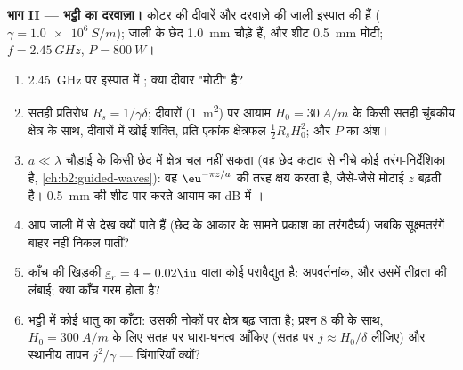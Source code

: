 \begin{problem}
\medskip
\noindent\textbf{भाग II --- भट्ठी का दरवाज़ा।}
कोटर की दीवारें और दरवाज़े की जाली इस्पात की हैं ($\gamma = \qty{1.0e6}{S/m}$);
जाली के छेद \qty{1.0}{mm} चौड़े हैं, और शीट \qty{0.5}{mm} मोटी;
$f = \qty{2.45}{GHz}$, $P = \qty{800}{W}$।
\begin{enumerate}[resume]
  \item \qty{2.45}{GHz} पर इस्पात में ; क्या दीवार "मोटी" है?
  \item सतही प्रतिरोध $R_s = 1/\gamma\delta$; दीवारों (\qty{1}{m^2}) पर आयाम
        $H_0 = \qty{30}{A/m}$ के किसी सतही चुंबकीय क्षेत्र के साथ,
        दीवारों में खोई शक्ति, प्रति एकांक क्षेत्रफल $\tfrac12R_sH_0^2$; और
        $P$ का अंश।
  \item $a \ll \lambda$ चौड़ाई के किसी छेद में क्षेत्र चल नहीं सकता (वह छेद
        कटाव से नीचे कोई तरंग-निर्देशिका है, \cref{ch:b2:guided-waves}):
        वह $\eu^{-\pi z/a}$ की तरह क्षय करता है, जैसे-जैसे मोटाई $z$ बढ़ती है।
        \qty{0.5}{mm} की शीट पार करते आयाम का dB में ।
  \item आप जाली में से देख क्यों पाते हैं (छेद के आकार के सामने
        प्रकाश का तरंगदैर्घ्य) जबकि सूक्ष्मतरंगें बाहर नहीं निकल पातीं?
  \item काँच की खिड़की $\underline\varepsilon_r = 4 - 0.02\iu$ वाला कोई परावैद्युत है:
        अपवर्तनांक, और उसमें तीव्रता की  लंबाई; क्या
        काँच गरम होता है?
  \item भट्ठी में कोई धातु का काँटा: उसकी नोकों पर क्षेत्र बढ़ जाता है;
        प्रश्न 8 की  के साथ, $H_0 = \qty{300}{A/m}$ के लिए सतह
        पर धारा-घनत्व आँकिए (सतह पर $j \approx H_0/\delta$ लीजिए)
        और स्थानीय तापन $j^2/\gamma$ --- चिंगारियाँ क्यों?
\end{enumerate}


\end{problem}
